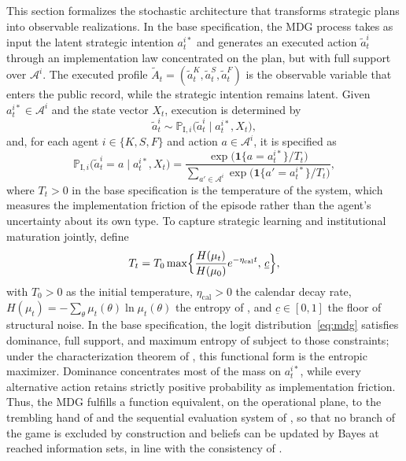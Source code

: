 \documentclass[pdflatex,sn-mathphys-ay]{sn-jnl}
\theoremstyle{plain}
\theoremstyle{definition}
\newcommand{\1}{\mathbf{1}}
\newcommand{\ProbI}[1]{\mathbb{P}_{\mathrm{I},#1}}
\begin{document}
This section formalizes the stochastic architecture that transforms strategic plans into observable realizations. In the base specification, the MDG process takes as input the latent strategic intention $a_t^{i\ast}$ and generates an executed action $\tilde{a}_t^i$ through an implementation law concentrated on the plan, but with full support over $\mathcal{A}^i$. The executed profile $\tilde{A}_t=(\tilde{a}_t^K,\tilde{a}_t^S,\tilde{a}_t^F)$ is the observable variable that enters the public record, while the strategic intention remains latent. Given $a_t^{i\ast}\in\mathcal{A}^i$ and the state vector $X_t$, execution is determined by
\[
\tilde{a}_t^i\sim\ProbI{i}\bigl(\tilde{a}_t^i\mid a_t^{i\ast},X_t\bigr),
\]
and, for each agent $i\in\{K,S,F\}$ and action $a\in\mathcal{A}^i$, it is specified as
\begin{equation}
\ProbI{i}\bigl(\tilde{a}_t^i=a\mid a_t^{i\ast},X_t\bigr)
=\frac{\exp\bigl(\mathbf{1}\{a=a_t^{i\ast}\}/T_t\bigr)}{\sum_{a'\in\mathcal{A}^i}\exp\bigl(\mathbf{1}\{a'=a_t^{i\ast}\}/T_t\bigr)},
\label{eq:mdg}
\end{equation}
where $T_t>0$ in the base specification is the temperature of the system, which measures the implementation friction of the episode rather than the agent's uncertainty about its own type. To capture strategic learning and institutional maturation jointly, define
\begin{equation}
T_t=T_0\max\Bigl\{\frac{H(\mu_t)}{H(\mu_0)}e^{-\eta_{\mathrm{cal}}t},\,\underline{c}\Bigr\},
\label{eq:temperature}
\end{equation}
with $T_0>0$ as the initial temperature, $\eta_{\mathrm{cal}}>0$ the calendar decay rate, $H(\mu_t)=-\sum_\theta\mu_t(\theta)\ln\mu_t(\theta)$ the entropy of \citet{Shannon1948}, and $\underline{c}\in[0,1]$ the floor of structural noise. In the base specification, the logit distribution~\eqref{eq:mdg} satisfies dominance, full support, and maximum entropy of \citet{Shannon1948} subject to those constraints; under the characterization theorem of \citet{Jaynes1957Information}, this functional form is the entropic maximizer. Dominance concentrates most of the mass on $a_t^{i\ast}$, while every alternative action retains strictly positive probability as implementation friction. Thus, the MDG fulfills a function equivalent, on the operational plane, to the trembling hand of \citet{Selten1975Perfectness} and the sequential evaluation system of \citet{KrepsWilson1982}, so that no branch of the game is excluded by construction and beliefs can be updated by Bayes at reached information sets, in line with the consistency of \citet{FudenbergTirole1991PBE}.
\end{document}
